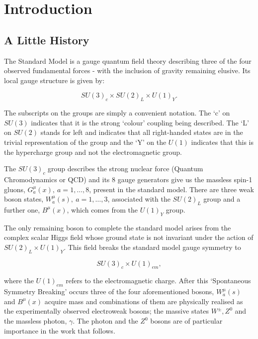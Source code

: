 
\chapter{Introduction}

	\label{chap:intro}

\section{A Little History}
	\label{sec:history}

	The Standard Model is a gauge quantum field theory describing three of the four observed
	fundamental forces - with the inclusion of gravity remaining elusive.
	Its local gauge structure is given by:

	\begin{equation}
		SU(3)_c\times SU(2)_L\times U(1)_Y.
		\label{eq:SMGauge}
	\end{equation}

	The subscripts on the groups are simply a convenient notation.  The `c' on $SU(3)$ indicates
	that it is the strong `colour' coupling being described.  The `L' on $SU(2)$ stands for left and indicates that
	all right-handed states are in the trivial representation of the group and the `Y' on the
	$U(1)$ indicates that this is the hypercharge group and not the electromagnetic group.

	The
	$SU(3)_c$ group describes the strong nuclear force (Quantum Chromodynamics or QCD) and its
	8 gauge generators give us the massless spin-1 gluons, $G_a^\mu(x),\ a=1,\ldots,8$, present
	in the standard model. There are three weak boson states, $W_a^\mu(s),\ a=1,\ldots,3$, associated
	with the $SU(2)_L$ group and a further one, $B^\mu(x)$, which comes from the $U(1)_Y$ group.

	The only remaining boson to complete the standard model arises from the complex scalar Higgs
	field whose ground state is not invariant under the action of $SU(2)_L\times U(1)_Y$. This
	field breaks the standard model gauge symmetry to

	\begin{equation}
		SU(3)_c\times U(1)_{em},
		\label{eq:SMGaugeBroken}
	\end{equation}

	\noindent where the $U(1)_{em}$ refers to the electromagnetic charge.  After this `Spontaneous
	Symmetry Breaking' occurs three of the four aforementioned bosons, $W_a^\mu(s)$ and $B^\mu(x)$
	acquire mass and combinations of them are physically realised as the experimentally observed
	electroweak bosons; the massive states $W^\pm, Z^0$ and the massless photon, $\gamma$.
	The photon and the $Z^0$ bosons are of particular importance in the work that follows.

